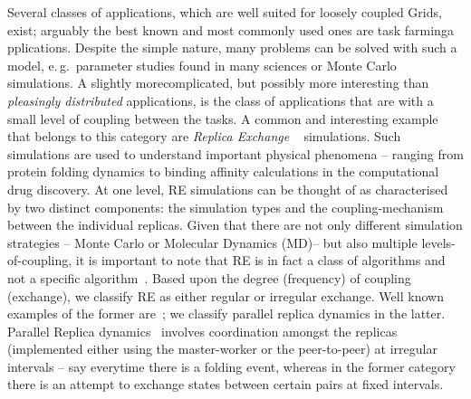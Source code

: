 \documentclass[times, 10pt,twocolumn]{article}
\begin{document}
\begin{abstract}
\end{abstract}

                           
Several classes of applications, which are well suited for loosely
coupled Grids, exist; arguably the best known and most commonly used
ones are task farminga pplications. Despite the simple nature, many
problems can be solved with such a model, e.\,g.\ parameter studies
found in many sciences or Monte Carlo simulations. A slightly
morecomplicated, but possibly more interesting than {\it pleasingly
  distributed} applications, is the class of applications that are
with a small level of coupling between the tasks.  
A common and interesting example that belongs to this category are
\emph{Replica Exchange }~\cite{hansmann,Sugita:1999rm} simulations.
Such simulations are used to understand important physical phenomena
-- ranging from protein folding dynamics to binding affinity
calculations in the computational drug discovery.  At one level, RE
simulations can be thought of as characterised by two distinct
components: the simulation types and the coupling-mechanism between
the individual replicas. Given that there are not only different
simulation strategies -- Monte Carlo or Molecular Dynamics (MD)-- but also
multiple levels-of-coupling, it is important to note that RE is in
fact a class of algorithms and not a specific
algorithm~\cite{dpa_surveypaper}.  Based upon the degree (frequency)
of coupling (exchange), we classify RE as either regular or irregular
exchange. Well known examples of the former
are~\cite{hansmann,Sugita:1999rm}; we classify parallel replica
dynamics in the latter. Parallel Replica dynamics~\cite{SPdynamics,
  pande_bj03} involves coordination amongst the replicas (implemented
either using the master-worker or the peer-to-peer) at irregular
intervals -- say everytime there is a folding event, whereas in the
former category there is an attempt to exchange states between certain
pairs at fixed intervals.

\end{document}
